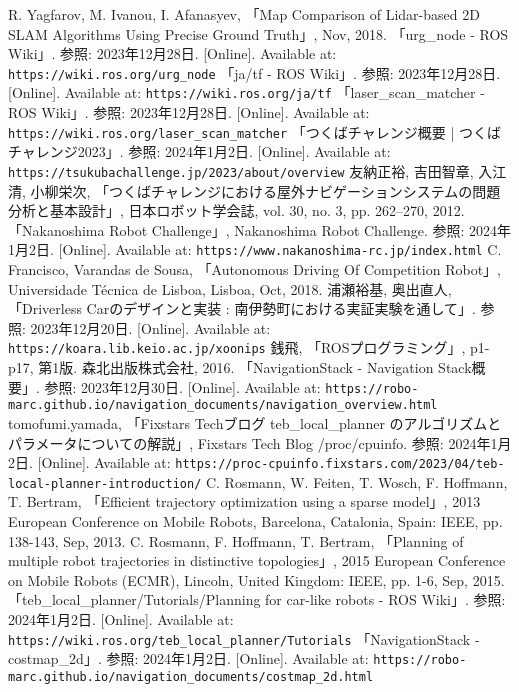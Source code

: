 \documentclass[a4paper,12pt]{jreport}
\begin{document}
\begin{thebibliography}{99}
  R. Yagfarov, M. Ivanou, I. Afanasyev, 「Map Comparison of Lidar-based 2D SLAM Algorithms Using Precise Ground Truth」, Nov, 2018.
  「urg\_node - ROS Wiki」. 参照: 2023年12月28日. [Online]. Available at: \verb|https://wiki.ros.org/urg_node|
  「ja/tf - ROS Wiki」. 参照: 2023年12月28日. [Online]. Available at: \verb|https://wiki.ros.org/ja/tf|
  「laser\_scan\_matcher - ROS Wiki」. 参照: 2023年12月28日. [Online]. Available at: \verb|https://wiki.ros.org/laser_scan_matcher|
  「つくばチャレンジ概要 | つくばチャレンジ2023」. 参照: 2024年1月2日. [Online]. Available at: \verb|https://tsukubachallenge.jp/2023/about/overview|
  友納正裕, 吉田智章, 入江清, 小柳栄次, 「つくばチャレンジにおける屋外ナビゲーションシステムの問題分析と基本設計」, 日本ロボット学会誌, vol. 30, no. 3, pp. 262–270, 2012.
  「Nakanoshima Robot Challenge」, Nakanoshima Robot Challenge. 参照: 2024年1月2日. [Online]. Available at: \verb|https://www.nakanoshima-rc.jp/index.html|
  C. Francisco, Varandas de Sousa, 「Autonomous Driving Of Competition Robot」, Universidade Técnica de Lisboa, Lisboa, Oct, 2018.
  浦瀬裕基, 奥出直人, 「Driverless Carのデザインと実装 : 南伊勢町における実証実験を通して」. 参照: 2023年12月20日. [Online]. Available at: \verb|https://koara.lib.keio.ac.jp/xoonips|
  銭飛, 「ROSプログラミング」, p1-p17, 第1版. 森北出版株式会社, 2016.
  「NavigationStack - Navigation Stack概要」. 参照: 2023年12月30日. [Online]. Available at: \verb|https://robo-marc.github.io/navigation_documents/navigation_overview.html|
  tomofumi.yamada, 「Fixstars Techブログ teb\_local\_planner のアルゴリズムとパラメータについての解説」, Fixstars Tech Blog /proc/cpuinfo. 参照: 2024年1月2日. [Online]. Available at: \verb|https://proc-cpuinfo.fixstars.com/2023/04/teb-local-planner-introduction/|
  C. Rosmann, W. Feiten, T. Wosch, F. Hoffmann, T. Bertram, 「Efficient trajectory optimization using a sparse model」, 2013 European Conference on Mobile Robots, Barcelona, Catalonia, Spain: IEEE, pp. 138-143, Sep, 2013.
  C. Rosmann, F. Hoffmann, T. Bertram, 「Planning of multiple robot trajectories in distinctive topologies」, 2015 European Conference on Mobile Robots (ECMR), Lincoln, United Kingdom: IEEE, pp. 1-6, Sep, 2015.
  「teb\_local\_planner/Tutorials/Planning for car-like robots - ROS Wiki」. 参照: 2024年1月2日. [Online]. Available at: \verb|https://wiki.ros.org/teb_local_planner/Tutorials|
  「NavigationStack - costmap\_2d」. 参照: 2024年1月2日. [Online]. Available at: \verb|https://robo-marc.github.io/navigation_documents/costmap_2d.html|
\end{thebibliography}
  
\end{document}
